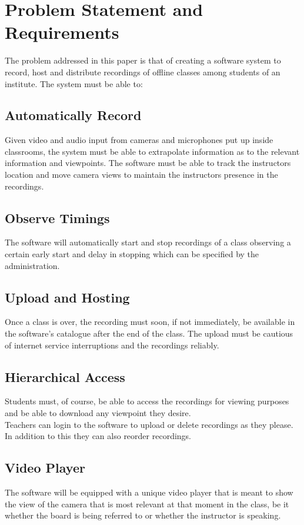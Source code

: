 \documentclass[12pt, conference]{IEEEtran}
\begin{document}
\section{Problem Statement and Requirements}
The problem addressed in this paper is that of creating a software system to record, host and distribute recordings of offline classes among students of an institute. The system must be able to:
\subsection{Automatically Record}
Given video and audio input from cameras and microphones put up inside classrooms, the system must be able to extrapolate information as to the relevant information and viewpoints. The software must be able to track the instructors location and move camera views to maintain the instructors presence in the recordings.
\subsection{Observe Timings}
The software will automatically start and stop recordings of a class observing a certain early start and delay in stopping which can be specified by the administration.
\subsection{Upload and Hosting}
Once a class is over, the recording must soon, if not immediately, be available in the software's catalogue after the end of the class. The upload must be cautious of internet service interruptions and the recordings reliably.
\subsection{Hierarchical Access}
Students must, of course, be able to access the recordings for viewing purposes and be able to download any viewpoint they desire.\\
Teachers can login to the software to upload or delete recordings as they please. In addition to this they can also reorder recordings.
\subsection{Video Player}
The software will be equipped with a unique video player that is meant to show the view of the camera that is most relevant at that moment in the class, be it whether the board is being referred to or whether the instructor is speaking.
\end{document}
